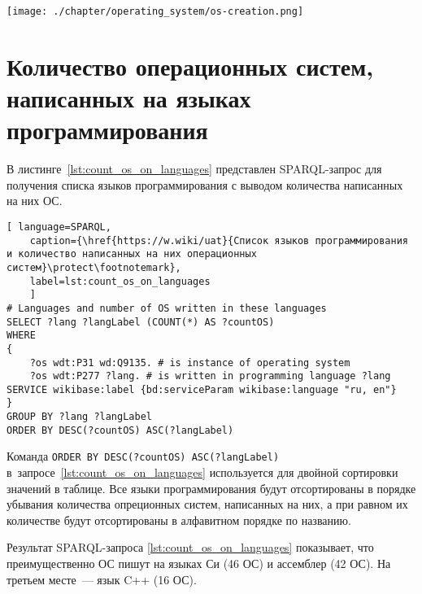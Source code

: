 \begin{figure*}[h!]
	\texttt{[image: ./chapter/operating\_system/os-creation.png]}
	\caption{Часть временной шкалы с датами выпуска операционных систем с~1955 по~2020 год. Шкала построена по запросу~\protect\ref{lst:inception_time_of_operating_systems}.}
	\label{fig:os_creation}
\end{figure*}



\section{Количество операционных систем, написанных на языках программирования}

В листинге~\ref{lst:count_os_on_languages} представлен SPARQL-запрос для получения списка языков программирования с выводом количества написанных на них ОС.


\marginnote[0.0cm]{
    \newline
    \newline
    \newline
    \newline
}
\begin{lstlisting}[ language=SPARQL, 
	caption={\href{https://w.wiki/uat}{Список языков программирования и количество написанных на них операционных систем}\protect\footnotemark},
	label=lst:count_os_on_languages
	]
# Languages and number of OS written in these languages
SELECT ?lang ?langLabel (COUNT(*) AS ?countOS)
WHERE 
{
	?os wdt:P31 wd:Q9135. # is instance of operating system
	?os wdt:P277 ?lang. # is written in programming language ?lang
SERVICE wikibase:label {bd:serviceParam wikibase:language "ru, en"}
}
GROUP BY ?lang ?langLabel
ORDER BY DESC(?countOS) ASC(?langLabel)
\end{lstlisting}

Команда \lstinline|ORDER BY DESC(?countOS) ASC(?langLabel)| в~запросе~\ref{lst:count_os_on_languages} используется для двойной сортировки значений в таблице. Все языки программирования будут отсортированы в порядке убывания количества опреционных систем, написанных на них, а при равном их количестве будут отсортированы в алфавитном порядке по названию.

Результат SPARQL-запроса \ref{lst:count_os_on_languages} показывает, 
что преимущественно ОС пишут на языках Си (46 ОС) и ассемблер (42 ОС). 
На третьем месте~--- язык C++ (16 ОС).

